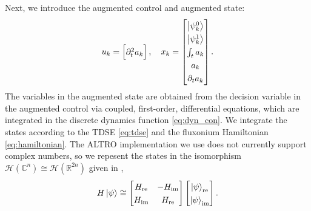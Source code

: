 Next, we introduce the augmented control and augmented state:
\begin{equation}
  \begingroup
  \renewcommand*{\arraystretch}{1.3}
  u_{k} = \begin{bmatrix} \partial^{2}_{t} a_{k} \end{bmatrix}, \quad
  x_{k} = \begin{bmatrix} \ket{\psi^{0}_{k}} \\ \ket{\psi^{1}_{k}}
    \\ \int_{t} a_{k} \\ a_{k} \\ \partial_{t} a_{k} \end{bmatrix}.
  \endgroup
  \label{eq:astatecontrols}
\end{equation}
The variables in the augmented state are obtained from the decision variable
in the augmented control
via coupled, first-order, differential equations, which are integrated in the 
discrete dynamics function \eqref{eq:dyn_con}.
We integrate the states according to the TDSE \eqref{eq:tdse} and the
fluxonium Hamiltonian \eqref{eq:hamiltonian}.
The ALTRO implementation we use does not currently
support complex numbers, so we repesent the states
in the isomorphism $\mathcal{H}(\mathbb{C}^{n})
\cong \mathcal{H}(\mathbb{R}^{2n})$ given in \cite{leung2017speedup},
\begin{equation}
  H \ket{\psi} \cong \begin{bmatrix} H_{\textrm{re}} & -H_{\textrm{im}}
    \\ H_{\textrm{im}} & H_{\textrm{re}}\end{bmatrix}
  \begin{bmatrix} \ket{\psi}_{\textrm{re}} \\ \ket{\psi}_{\textrm{im}}\end{bmatrix}.
  \label{eq:isomorphism}
\end{equation}

